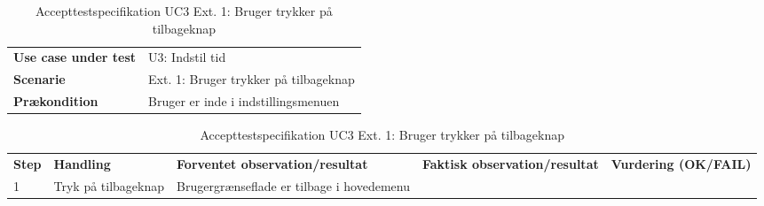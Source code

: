\begin{table}[H]
	\centering
	\caption{Accepttestspecifikation UC3 Ext. 1: Bruger trykker på tilbageknap}
	\label{ATUC1:Ext1}
	\begin{tabular}{ p{80pt}  p{320pt} }\hline
		\rowcolor{lightgray}	
		\textbf{Use case under test} & U3: Indstil tid \\
		\rowcolor{white}
		\textbf{Scenarie} & Ext. 1: Bruger trykker på tilbageknap \\\rowcolor{lightgray}	
		\textbf{Prækondition} &
		Bruger er inde i indstillingsmenuen \\
		\hline
	\end{tabular}
	\begin{tabular}{  p{26pt} p{100pt}  p{101pt} | p{67pt} | p{68pt}}
		\textbf{Step} & \textbf{Handling} & \textbf{Forventet observation/resultat} & \textbf{Faktisk observation/resultat} & \textbf{Vurdering (OK/FAIL)}\\
		1 & Tryk på tilbageknap & Brugergrænseflade er tilbage i hovedemenu
 &  &  \\
		\hline
	\end{tabular}
\end{table}

